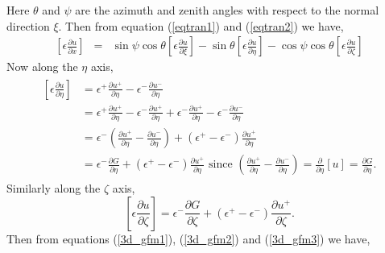 Here $\theta$ and $\psi $ are the azimuth and zenith angles with respect to the normal direction $\xi$.
Then from equation (\ref{eqtran1}) and (\ref{eqtran2}) we have, 
\begin{eqnarray}
	\left[\epsilon \frac{\partial u}{\partial x}\right] &=& \sin \psi \cos \theta \left[\epsilon \frac{\partial u}{\partial \xi}\right]-\sin \theta \left[\epsilon \frac{\partial u}{\partial \eta}\right]-\cos \psi \cos \theta \left[\epsilon \frac{\partial u}{\partial \zeta}\right]\label{3d_gfm1}
\end{eqnarray}
Now along the $\eta$ axis,
\begin{eqnarray}
\begin{aligned}
	\left[\epsilon \frac{\partial u}{\partial \eta}\right] &= \epsilon^+\frac{\partial u^+}{\partial \eta }-\epsilon^-\frac{\partial u^-}{\partial \eta }\\
	&=\epsilon^+\frac{\partial u^+}{\partial \eta }-\epsilon^-\frac{\partial u^+}{\partial \eta }+\epsilon^-\frac{\partial u^+}{\partial \eta }-\epsilon^-\frac{\partial u^-}{\partial \eta }\\
	&= \epsilon^-\left(\frac{\partial u^+}{\partial \eta }-\frac{\partial u^-}{\partial \eta }\right)+(\epsilon^+-\epsilon^-)\frac{\partial u^+}{\partial \eta}\\
	&= \epsilon^-\frac{\partial G}{\partial \eta}+(\epsilon^+-\epsilon^-)\frac{\partial u^+}{\partial \eta}\text{ since } \left(\frac{\partial u^+}{\partial \eta }-\frac{\partial u^-}{\partial \eta }\right)=\frac{\partial}{\partial\eta}[u]=\frac{\partial G}{\partial \eta}.\label{3d_gfm2}
\end{aligned}
\end{eqnarray}
Similarly along the $\zeta $ axis, 
\begin{equation}
	\left[\epsilon \frac{\partial u}{\partial \zeta}\right]= \epsilon^-\frac{\partial G}{\partial \zeta}+(\epsilon^+-\epsilon^-)\frac{\partial u^+}{\partial \zeta }.\label{3d_gfm3}
\end{equation}
Then from equations (\ref{3d_gfm1}), (\ref{3d_gfm2}) and (\ref{3d_gfm3}) we have,
